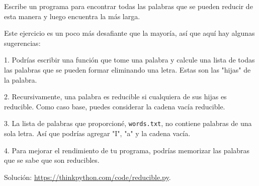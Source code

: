 Escribe un programa para encontrar todas las palabras que se pueden reducir de esta manera y luego encuentra la más larga.

Este ejercicio es un poco más desafiante que la mayoría, así que aquí hay algunas sugerencias:

1. Podrías escribir una función que tome una palabra y calcule una lista de todas las palabras que se pueden formar eliminando una letra. Estas son las "hijas" de la palabra.

2. Recursivamente, una palabra es reducible si cualquiera de sus hijas es reducible. Como caso base, puedes considerar la cadena vacía reducible.

3. La lista de palabras que proporcioné, \texttt{words.txt}, no contiene palabras de una sola letra. Así que podrías agregar "I", "a" y la cadena vacía.

4. Para mejorar el rendimiento de tu programa, podrías memorizar las palabras que se sabe que son reducibles.

Solución: \url{https://thinkpython.com/code/reducible.py}.